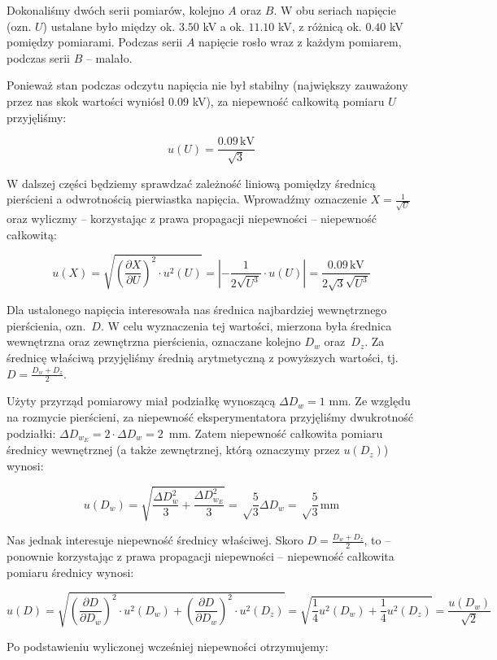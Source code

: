 \documentclass[a4paper]{article}
\newlength{\du}
\begin{document}
Dokonaliśmy dwóch serii pomiarów, kolejno $A$ oraz $B$.
W obu seriach napięcie (ozn. $U$) ustalane było między ok. $3.50$ kV a ok. $11.10$ kV, z różnicą ok. $0.40$ kV pomiędzy pomiarami.
Podczas serii $A$ napięcie rosło wraz z każdym pomiarem, podczas serii $B$ -- malało.

Ponieważ stan podczas odczytu napięcia nie był stabilny (największy zauważony przez nas skok wartości wyniósł $0.09$ kV), za niepewność całkowitą pomiaru $U$ przyjęliśmy:

$$u(U) = \frac{0.09 \, \text{kV}}{\sqrt 3}$$

W dalszej części będziemy sprawdzać zależność liniową pomiędzy średnicą pierścieni a odwrotnością pierwiastka napięcia.
Wprowadźmy oznaczenie $X = \frac{1}{\sqrt U}$ oraz wyliczmy -- korzystając z prawa propagacji niepewności -- niepewność całkowitą:

$$u(X) = \sqrt{\left(\frac{\partial X}{\partial U}\right)^2 \cdot u^2(U)} = \left| -\frac{1}{2 \sqrt{U^3}} \cdot u(U)\right| = \frac{0.09 \, \text{kV}}{2 \sqrt{3} \sqrt{U^3}}$$

Dla ustalonego napięcia interesowała nas średnica najbardziej wewnętrznego pierścienia, ozn.~$D$.
W celu wyznaczenia tej wartości, mierzona była średnica wewnętrzna oraz zewnętrzna pierścienia, oznaczane kolejno $D_w$ oraz~$D_z$.
Za średnicę właściwą przyjęliśmy średnią arytmetyczną z powyższych wartości, tj.~$D = \frac {D_w + D_z}{2}$.

Użyty przyrząd pomiarowy miał podziałkę wynoszącą $\Delta D_w = 1$ mm.
Ze względu na rozmycie pierścieni, za niepewność eksperymentatora przyjęliśmy dwukrotność podziałki: $\Delta D_{w_E} = 2 \cdot \Delta D_w = 2$~mm.
Zatem niepewność całkowita pomiaru średnicy wewnętrznej (a także zewnętrznej, którą oznaczymy przez $u(D_z)$) wynosi:

$$u(D_w) = \sqrt{\frac{\Delta D_w^2}{3} + \frac{\Delta D_{w_E}^2}{3}} = \sqrt \frac{5}{3} \Delta D_w = \sqrt \frac{5}{3} \, \text{mm}$$

Nas jednak interesuje niepewność średnicy właściwej.
Skoro $D = \frac {D_w + D_z}{2}$, to -- ponownie korzystając z prawa propagacji niepewności -- niepewność całkowita pomiaru średnicy wynosi:

$$u(D) = \sqrt{\left(\frac{\partial D}{\partial D_w}\right)^2 \cdot u^2(D_w) + \left(\frac{\partial D}{\partial D_w}\right)^2 \cdot u^2(D_z)} = \sqrt{\frac{1}{4} u^2(D_w) + \frac{1}{4} u^2(D_z)} = \frac{u(D_w)}{\sqrt{2}}$$

Po podstawieniu wyliczonej wcześniej niepewności otrzymujemy:
\end{document}
